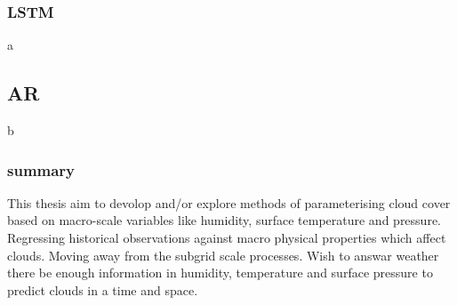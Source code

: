 \subsubsection{LSTM}
a

\subsection{AR}
b




\subsubsection{summary}
This thesis aim to devolop and/or explore methods of parameterising cloud cover based on macro-scale variables like humidity, surface temperature and pressure. Regressing historical observations against macro physical properties which affect clouds. Moving away from the subgrid scale processes. Wish to answar weather there be enough information in humidity, temperature and surface pressure to predict clouds in a time and space.




